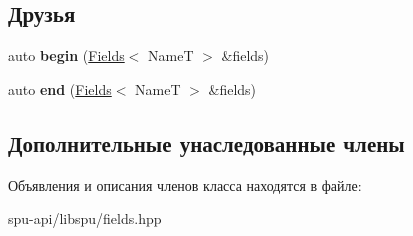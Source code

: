 \subsection*{Друзья}
\begin{DoxyCompactItemize}
\item 
\mbox{\label{class_s_p_u_1_1_fields_aae763230135b011d2ac87be7970d9766}} 
auto {\bfseries begin} (\hyperlink{class_s_p_u_1_1_fields}{Fields}$<$ NameT $>$ \&fields)
\item 
\mbox{\label{class_s_p_u_1_1_fields_a0f39af32a7d42af30295d17d5e202692}} 
auto {\bfseries end} (\hyperlink{class_s_p_u_1_1_fields}{Fields}$<$ NameT $>$ \&fields)
\end{DoxyCompactItemize}
\subsection*{Дополнительные унаследованные члены}


Объявления и описания членов класса находятся в файле\+:\begin{DoxyCompactItemize}
\item 
spu-\/api/libspu/fields.\+hpp\end{DoxyCompactItemize}
